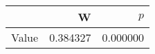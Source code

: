 \begin{tabular}{lrr}
\toprule
 & W & $p$ \\
\midrule
Value & 0.384327 & 0.000000 \\
\bottomrule
\end{tabular}
